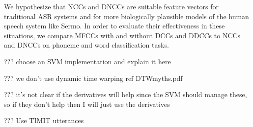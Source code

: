 We hypothesize that NCCs and DNCCs
are suitable feature vectors
for traditional ASR systems
and for more biologically plausible
models of the human speech system like Sermo.
In order to evaluate their effectiveness
in these situations,
we compare MFCCs with and without DCCs
and DDCCs to NCCs and DNCCs
on phoneme and word classification tasks.

??? choose an SVM implementation and
explain it here

??? we don't use dynamic time warping
ref DTWmyths.pdf

??? it's not clear if the derivatives will help
since the SVM should manage these,
so if they don't help then I will
just use the derivatives

??? Use TIMIT utterances








